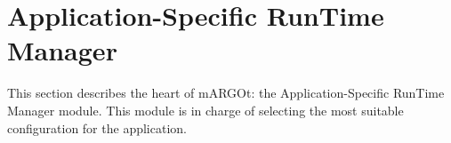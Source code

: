 \section{Application-Specific RunTime Manager}

This section describes the heart of mARGOt: the Application-Specific RunTime Manager module.
This module is in charge of selecting the most suitable configuration for the application.